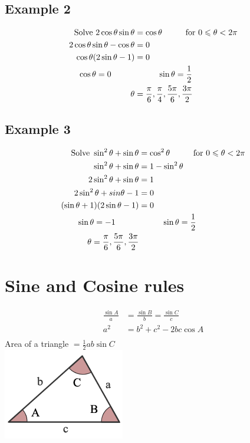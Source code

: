 \documentclass[a4paper,12pt]{article}
\begin{document}
\subsection*{Example 2}
\begin{align*}
\text{Solve } 2 \cos \theta \sin \theta & = \cos \theta \hspace*{1cm} \text{for } 0 \leqslant \theta <  2\pi \\
2 \cos \theta \sin \theta - \cos \theta & = 0 \\
\cos \theta (2\sin \theta - 1) & = 0 \\
\cos \theta = 0 \hspace*{1cm} & \hspace*{1cm} \sin \theta = \frac{1}{2} \\ 
\theta & = \frac{\pi}{6}, \frac{\pi}{4}, \frac{5 \pi}{6}, \frac{3 \pi}{2} \\
\end{align*}
\subsection*{Example 3}
\begin{align*}
\text{Solve } \sin^2 \theta + \sin \theta & = \cos^2 \theta \hspace*{1cm} \text{for } 0 \leqslant \theta < 2 \pi \\
\sin^2 \theta + \sin \theta & = 1 - \sin^2 \theta \\
2 \sin^2 \theta + \sin \theta & = 1 \\
2 \sin^2 \theta + sin \theta - 1 & = 0 \\
(\sin \theta + 1)(2 \sin \theta -1) & = 0 \\
\sin \theta = -1 \hspace*{1cm} & \hspace*{1cm} \sin \theta = \frac{1}{2} \\
\theta = \frac{\pi}{6}, \frac{5 \pi}{6}, \frac{3 \pi}{2} & \\ 
\end{align*}
\section*{Sine and Cosine rules}
\begin{align*}
\frac{\sin A}{a} & = \frac{\sin B}{b} = \frac{\sin C}{c} \\
a^2 &= b^2 + c^2 - 2bc \cos A \\ 
\end{align*}
Area of a triangle $ = \frac{1}{2} ab \sin C$ \\ 
\includegraphics[scale=0.7]{Triangle} \\\\
\end{document}

